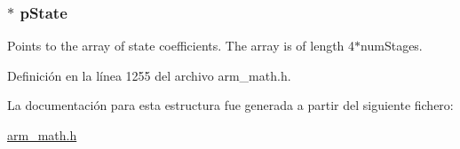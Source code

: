 \subsubsection[{\texorpdfstring{p\+State}{pState}}]{$\ast$ p\+State}\hypertarget{structarm__biquad__casd__df1__inst__q31_adee4ba3ee8869865af7d8fa08ca913d6}{}\label{structarm__biquad__casd__df1__inst__q31_adee4ba3ee8869865af7d8fa08ca913d6}
Points to the array of state coefficients. The array is of length 4$\ast$num\+Stages. 

Definición en la línea 1255 del archivo arm\+\_\+math.\+h.



La documentación para esta estructura fue generada a partir del siguiente fichero\+:\begin{DoxyCompactItemize}
\item 
\hyperlink{arm__math_8h}{arm\+\_\+math.\+h}\end{DoxyCompactItemize}
